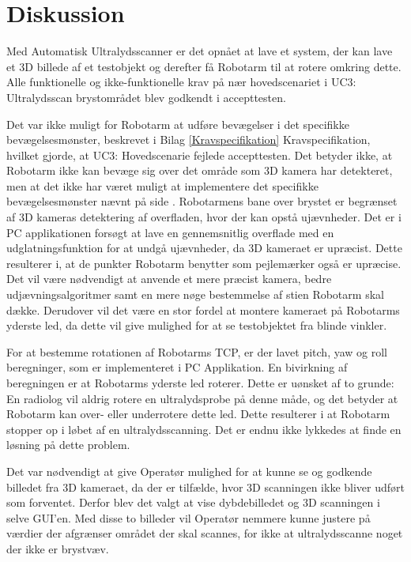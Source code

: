 \chapter{Diskussion}\label{kapitel_Diskussion}
Med Automatisk Ultralydsscanner er det opnået at lave et system, der kan lave et 3D billede af et testobjekt og derefter få Robotarm til at rotere omkring dette. Alle funktionelle og ikke-funktionelle krav på nær hovedscenariet i UC3: Ultralydsscan brystområdet blev godkendt i accepttesten. 

Det var ikke muligt for Robotarm at udføre bevægelser i det specifikke bevægelsesmønster, beskrevet i Bilag \ref{Kravspecifikation} Kravspecifikation, hvilket gjorde, at UC3: Hovedscenarie fejlede accepttesten. Det betyder ikke, at Robotarm ikke kan bevæge sig over det område som 3D kamera har detekteret, men at det ikke har været muligt at implementere det specifikke bevægelsesmønster nævnt på side \pageref{Probensbevagelse}. Robotarmens bane over brystet er begrænset af 3D kameras detektering af overfladen, hvor der kan opstå ujævnheder. Det er i PC applikationen forsøgt at lave en gennemsnitlig overflade med en udglatningsfunktion for at undgå ujævnheder, da 3D kameraet er upræcist. Dette resulterer i, at de punkter Robotarm benytter som pejlemærker også er upræcise. Det vil være nødvendigt at anvende et mere præcist kamera, bedre udjævningsalgoritmer samt en mere nøge bestemmelse af stien Robotarm skal dække. Derudover vil det være en stor fordel at montere kameraet på Robotarms yderste led, da dette vil give mulighed for at se testobjektet fra blinde vinkler.

For at bestemme rotationen af Robotarms TCP, er der lavet pitch, yaw og roll beregninger, som er implementeret i PC Applikation. En bivirkning af beregningen er at Robotarms yderste led roterer. Dette er uønsket af to grunde: En radiolog vil aldrig rotere en ultralydsprobe på denne måde, og det betyder at Robotarm kan over- eller underrotere dette led. Dette resulterer i at Robotarm stopper op i løbet af en ultralydsscanning. Det er endnu ikke lykkedes at finde en løsning på dette problem.

Det var nødvendigt at give Operatør mulighed for at kunne se og godkende billedet fra 3D kameraet, da der er tilfælde, hvor 3D scanningen ikke bliver udført som forventet. Derfor blev det valgt at vise dybdebilledet og 3D scanningen i selve GUI'en. Med disse to billeder vil Operatør nemmere kunne justere på værdier der afgrænser området der skal scannes, for ikke at ultralydsscanne noget der ikke er brystvæv.

